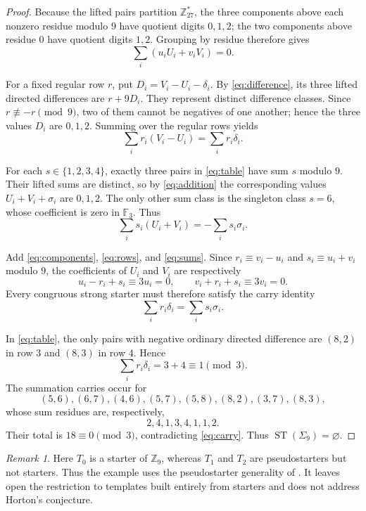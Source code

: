 \documentclass[11pt]{amsart}
\theoremstyle{remark}
\newtheorem*{remark}{Remark}
\newcommand{\Z}{\mathbb Z}
\newcommand{\F}{\mathbb F}
\newcommand{\ST}{\operatorname{ST}}
\begin{document}
\begin{proof}
Because the lifted pairs partition $\Z_{27}^*$, the three components
above each nonzero residue modulo $9$ have quotient digits $0,1,2$; the
two components above residue $0$ have quotient digits $1,2$. Grouping by
residue therefore gives
\begin{equation}\label{eq:components}
 \sum_i (u_iU_i+v_iV_i)=0.
\end{equation}

For a fixed regular row $r$, put
$D_i=V_i-U_i-\delta_i$. By \eqref{eq:difference}, its three lifted
directed differences are $r+9D_i$. They represent distinct difference
classes. Since $r\not\equiv-r\pmod 9$, two of them cannot be negatives of
one another; hence the three values $D_i$ are $0,1,2$. Summing over the
regular rows yields
\begin{equation}\label{eq:rows}
 \sum_i r_i(V_i-U_i)=\sum_i r_i\delta_i.
\end{equation}

For each $s\in\{1,2,3,4\}$, exactly three pairs in \eqref{eq:table} have
sum $s$ modulo $9$. Their lifted sums are distinct, so by
\eqref{eq:addition} the corresponding values
$U_i+V_i+\sigma_i$ are $0,1,2$. The only other sum class is the singleton
class $s=6$, whose coefficient is zero in $\F_3$. Thus
\begin{equation}\label{eq:sums}
 \sum_i s_i(U_i+V_i)=-\sum_i s_i\sigma_i.
\end{equation}

Add \eqref{eq:components}, \eqref{eq:rows}, and \eqref{eq:sums}. Since
$r_i\equiv v_i-u_i$ and $s_i\equiv u_i+v_i$ modulo $9$, the coefficients
of $U_i$ and $V_i$ are respectively
\[
 u_i-r_i+s_i\equiv3u_i=0,
 \qquad
 v_i+r_i+s_i\equiv3v_i=0.
\]
Every congruous strong starter must therefore satisfy the carry identity
\begin{equation}\label{eq:carry}
 \sum_i r_i\delta_i=\sum_i s_i\sigma_i.
\end{equation}

In \eqref{eq:table}, the only pairs with negative ordinary directed
difference are $(8,2)$ in row $3$ and $(8,3)$ in row $4$. Hence
\[
 \sum_i r_i\delta_i=3+4\equiv1\pmod3.
\]
The summation carries occur for
\[
(5,6),(6,7),(4,6),(5,7),(5,8),(8,2),(3,7),(8,3),
\]
whose sum residues are, respectively,
\[
2,4,1,3,4,1,1,2.
\]
Their total is $18\equiv0\pmod3$, contradicting \eqref{eq:carry}. Thus
$\ST(\Sigma_9)=\varnothing$.
\end{proof}

\begin{remark}
Here $T_0$ is a starter of $\Z_9$, whereas $T_1$ and $T_2$ are
pseudostarters but not starters. Thus the example uses the pseudostarter
generality of \cite[Conjecture~7.1]{OSK}. It leaves open the restriction to
templates built entirely from starters and does not address Horton's
conjecture.
\end{remark}
\end{document}

